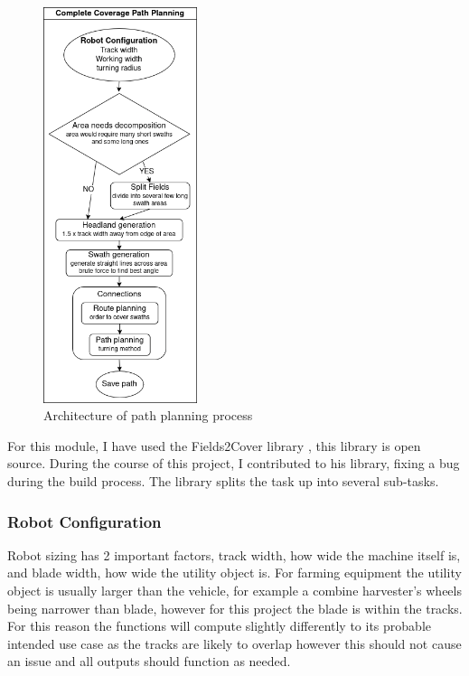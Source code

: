 \documentclass[final]{cmpreport_02}
\begin{document}
\begin{figure}[H]
	\centering
	\includegraphics[width=0.4\textwidth]{./images/pathPlanning.drawio.png}
	\caption{Architecture of path planning process}
	\label{PP:arch}
\end{figure}


For this module, I have used the Fields2Cover library \citep{fields2cover}, this library is open source.
During the course of this project, I contributed to his library, fixing a bug during the build process.
The library splits the task up into several sub-tasks.


\subsubsection{Robot Configuration}
Robot sizing has 2 important factors, track width, how wide the machine itself is, and blade width, how wide the utility object is.
For farming equipment the utility object is usually larger than the vehicle, for example a combine harvester's wheels being narrower than blade, however for this project the blade is within the tracks.
For this reason the functions will compute slightly differently to its probable intended use case as the tracks are likely to overlap however this should not cause an issue and all outputs should function as needed.
\end{document}

